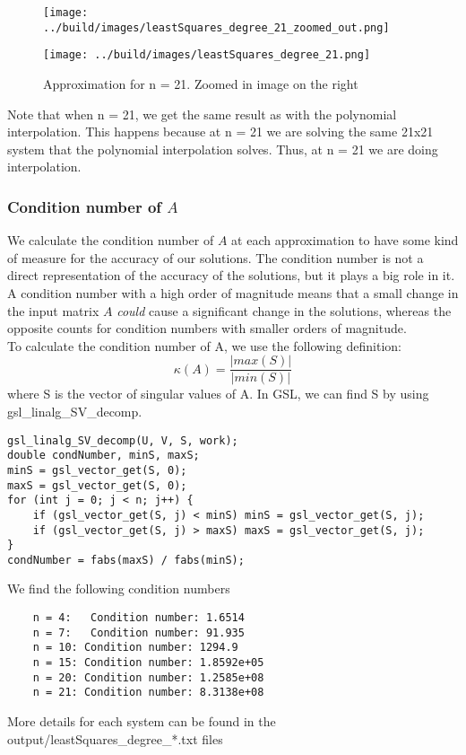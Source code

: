 \documentclass[11pt, a4paper, titlepage, openright]{article}
\begin{document}
    \begin{figure}[H]
        \begin{minipage}[b]{0.49\textwidth}
            \texttt{[image: ../build/images/leastSquares\_degree\_21\_zoomed\_out.png]}
        \end{minipage}
        \hfill
        \begin{minipage}[b]{0.49\textwidth}
            \texttt{[image: ../build/images/leastSquares\_degree\_21.png]}
        \end{minipage}
        \caption{Approximation for n = 21. Zoomed in image on the right}
        \label{fig:results4}
    \end{figure}
    Note that when n = 21, we get the same result as with the polynomial interpolation.
    This happens because at n = 21 we are solving the same 21x21 system that the polynomial interpolation solves.
    Thus, at n = 21 we are doing interpolation.

\subsubsection{Condition number of \(A\)}
    We calculate the condition number of \(A\) at each approximation to have some kind of measure for the accuracy of our solutions.
    The condition number is not a direct representation of the accuracy of the solutions, but it plays a big role in it.
    A condition number with a high order of magnitude means that a small change in the input matrix \(A\) \emph{could}
    cause a significant change in the solutions, whereas the opposite counts for condition numbers with smaller orders of magnitude.\\
    To calculate the condition number of A, we use the following definition: \[\kappa(A)= \frac{|max(S)|}{|min(S)|} \]
    where S is the vector of singular values of A. In GSL, we can find S by using gsl\_linalg\_SV\_decomp.
\begin{lstlisting}
gsl_linalg_SV_decomp(U, V, S, work);
double condNumber, minS, maxS;
minS = gsl_vector_get(S, 0);
maxS = gsl_vector_get(S, 0);
for (int j = 0; j < n; j++) {
    if (gsl_vector_get(S, j) < minS) minS = gsl_vector_get(S, j);
    if (gsl_vector_get(S, j) > maxS) maxS = gsl_vector_get(S, j);
}
condNumber = fabs(maxS) / fabs(minS);
\end{lstlisting}
    We find the following condition numbers
\begin{lstlisting}
	n = 4:   Condition number: 1.6514
	n = 7:   Condition number: 91.935
	n = 10: Condition number: 1294.9
	n = 15: Condition number: 1.8592e+05
	n = 20: Condition number: 1.2585e+08
	n = 21: Condition number: 8.3138e+08
\end{lstlisting}
More details for each system can be found in the output/leastSquares\_degree\_*.txt files
\end{document}
